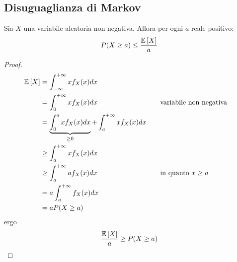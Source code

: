 \subsection{Disuguaglianza di Markov}
\begin{teor} \label{teor:markov}
	Sia $X$ una variabile aleatoria non negativa. Allora per ogni $a$ reale positivo:
	\begin{equation*}
		P(X\geq a) \leq \frac{\mathbb{E}\left[ X \right]}{a}
	\end{equation*}
\end{teor}
\begin{proof}
	\begin{align*}
		\mathbb{E}\left[ X \right] & = \int_{-\infty}^{+\infty} x f_X(x) dx                                      \\
		       & = \int_0^{+\infty} x f_X(x) dx                  & \quad & \text{variabile non negativa} \\
		       & = \underbrace{\int_0^a x f_X(x) dx}_{\geq 0} + \int_a^{+\infty} x f_X(x) dx \\
		       & \geq \int_a^{+\infty} x f_X(x) dx                                           \\
		       & \geq \int_a^{+\infty} a f_X(x) dx                  & \quad & \text{in quanto $x\geq a$} \\
		       & = a \int_a^{+\infty} f_X(x) dx                                              \\
		       & = a P(X\geq a)
	\end{align*}
	ergo
	\begin{equation*}
		\frac{\mathbb{E}\left[ X \right]}{a}\geq P(X\geq a)
	\end{equation*}
\end{proof}



